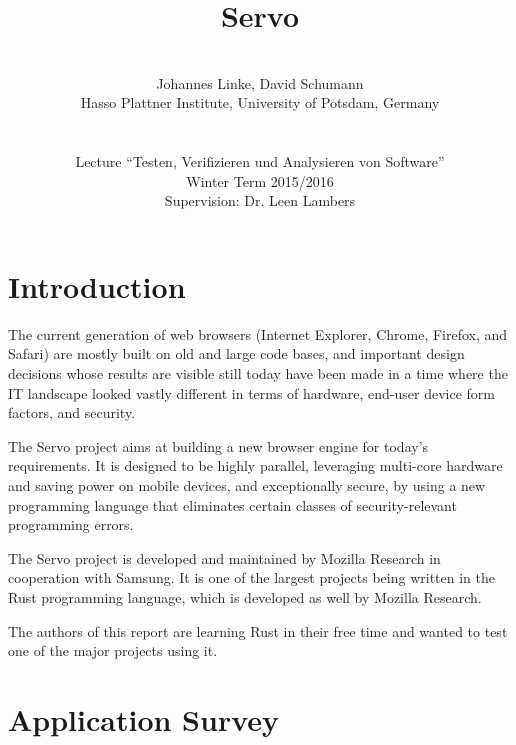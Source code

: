 \documentclass{scrartcl}
\begin{document}
\title{Servo}
\author{\\ Johannes Linke, David Schumann\\ Hasso Plattner Institute, University of Potsdam, Germany\\ \\ \\
Lecture ``Testen, Verifizieren und Analysieren von Software''\\ Winter Term 2015/2016\\ Supervision: Dr. Leen Lambers \vspace{320px}}

\maketitle
\thispagestyle{empty}

\newpage

\tableofcontents

\newpage



\section{Introduction}

The current generation of web browsers (Internet Explorer, Chrome, Firefox, and Safari) are mostly built on old and large code bases, and important design decisions whose results are visible still today have been made in a time where the IT landscape looked vastly different in terms of hardware, end-user device form factors, and security.

The Servo project aims at building a new browser engine for today's requirements. It is designed to be highly parallel, leveraging multi-core hardware and saving power on mobile devices, and exceptionally secure, by using a new programming language that eliminates certain classes of security-relevant programming errors.

The Servo project is developed and maintained by Mozilla Research in cooperation with Samsung. It is one of the largest projects being written in the Rust programming language, which is developed as well by Mozilla Research.

The authors of this report are learning Rust in their free time and wanted to test one of the major projects using it.


\newpage


\section{Application Survey}
\end{document}

